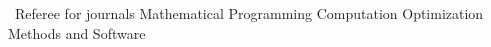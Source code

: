 \prefix{\faAngleRight}
\begin{rubric}{\faBook\ Referee for journals}
	\entry* Mathematical Programming Computation
	\entry* Optimization Methods and Software
\end{rubric}
